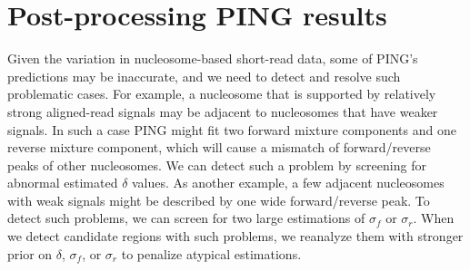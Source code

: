 \documentclass[11pt]{article}
\begin{document}
%
%
%
%
%


\section{Post-processing PING results}
Given the variation in nucleosome-based short-read data, some of PING's predictions may be inaccurate, and we need to detect and resolve such problematic cases. 
For example, a nucleosome that is supported by relatively strong aligned-read signals may be adjacent to nucleosomes that have weaker signals. In such a case PING might fit two forward mixture components and one reverse mixture component, which will cause a mismatch of forward/reverse peaks of other nucleosomes. 
We can detect such a problem by screening for abnormal estimated $\delta$ values. As another example, a few adjacent nucleosomes with weak signals might be described by one wide forward/reverse peak. To detect such problems, we can screen for two large estimations of $\sigma_f$ or $\sigma_r$. When we detect candidate regions with such problems, we reanalyze them with stronger prior on $\delta$,  $\sigma_f$, or $\sigma_r$ to penalize atypical estimations.
\end{document}
